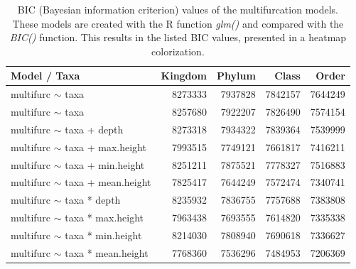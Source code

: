       \begin{table}[h]
        \begin{center}
          \begin{tabular}{ |l|r|r|r|r| }
            \hline
            \bfseries Model / Taxa & \bfseries Kingdom & \bfseries Phylum & \bfseries Class & \bfseries Order \\
            \hline \hline
            multifurc $\sim$ taxa & 8273333 & \cellcolor{green!15}7937828 & \cellcolor{green!20}7842157 & \cellcolor{green!30}7644249 \\
            multifurc $\sim$ taxa & 8257680 & \cellcolor{green!15}7922207 & \cellcolor{green!20}7826490 & \cellcolor{green!35}7574154 \\
            \hline
            multifurc $\sim$ taxa + depth & 8273318 & \cellcolor{green!15}7934322 & \cellcolor{green!20}7839364 & \cellcolor{green!35}7539999 \\
            multifurc $\sim$ taxa + max.height & \cellcolor{green!15}7993515 & \cellcolor{green!25}7749121 & \cellcolor{green!30}7661817 & \cellcolor{green!40}7416211 \\
            multifurc $\sim$ taxa + min.height & 8251211 & \cellcolor{green!20}7875521  & \cellcolor{green!25}7778327 & \cellcolor{green!35}7516883 \\
            multifurc $\sim$ taxa + mean.height & \cellcolor{green!20}7825417 & \cellcolor{green!30}7644249 & \cellcolor{green!35}7572474 & \cellcolor{green!45}7340741 \\
            \hline
            multifurc $\sim$ taxa * depth & 8235932 & \cellcolor{green!20}7836755 & \cellcolor{green!25}7757688 & \cellcolor{green!45}7383808 \\
            multifurc $\sim$ taxa * max.height & \cellcolor{green!15}7963438 & \cellcolor{green!30}7693555 & \cellcolor{green!30}7614820 & \cellcolor{green!45}7335338 \\
            multifurc $\sim$ taxa * min.height & 8214030 & \cellcolor{green!20}7808940 & \cellcolor{green!30}7690618 & \cellcolor{green!45}7336627\\
            multifurc $\sim$ taxa * mean.height & \cellcolor{green!25}7768360 & \cellcolor{green!35}7536296 & \cellcolor{green!50}7484953 & \cellcolor{green!50}7206369 \\
            \hline
          \end{tabular} 
        \end{center}
        \caption{BIC (Bayesian information criterion) values of the multifurcation models. \\
          These models are created with the R function \textit{glm()} and compared with the \textit{BIC()} 
            function. This results in the listed BIC values, presented in a heatmap colorization.}
        \label{table:BIC multifurcation} 
      \end{table}
